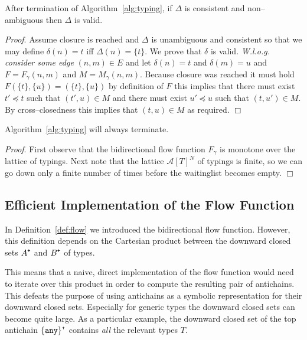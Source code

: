 \documentclass{sigplanconf}
\newcommand{\mc}[1]{\mathcal{#1}}
\newcommand{\mt}[1]{\text{\tt #1}}
\begin{document}
\begin{samepage}
\begin{theorem}[Soundness]
After termination of Algorithm~\ref{alg:typing}, if $\Delta$ is
consistent and non--ambiguous then $\Delta$ is valid.
\end{theorem}
\emph{Proof}.
Assume closure is reached and $\Delta$ is unambiguous and consistent
so that we may define $\delta(n) = t$ iff $\Delta(n) = \{t\}$. We
prove that $\delta$ is valid. \emph{W.l.o.g. consider some edge} $(n,
m) \in E$ and let $\delta(n) = t$ and $\delta(m) = u$ and $F =
F_\gamma(n, m)$ and $M = M_\gamma(n, m)$. Because closure was reached
it must hold $F(\{t\}, \{u\}) = (\{t\}, \{u\})$ by definition of $F$
this implies that there must exist $t' \preceq t$ such that $(t', u)
\in M$ and there must exist $u' \preceq u$ such that $(t, u') \in
M$. By cross--closedness this implies that $(t, u) \in M$ as
required. $\Box$
\end{samepage}

\begin{samepage}
\begin{theorem}[Termination]
Algorithm~\ref{alg:typing} will always terminate.
\end{theorem}
\emph{Proof}. First observe that the bidirectional flow function
$F_\gamma$ is monotone over the lattice of typings. Next note that the
lattice $\mc{A}[T]^N$ of typings is finite, so we can go down only a
finite number of times before the waitinglist becomes empty. $\Box$
\end{samepage}

\subsection{Efficient Implementation of the Flow Function}\label{sec:efficient}

In Definition~\ref{def:flow} we introduced the bidirectional flow
function. However, this definition depends on the Cartesian product
between the downward closed sets $A^\mt{+}$ and $B^\mt{+}$ of types.

This means that a naive, direct implementation of the flow function
would need to iterate over this product in order to compute the
resulting pair of antichains. This defeats the purpose of using
antichains as a symbolic representation for their downward closed
sets. Especially for generic types the downward closed sets can become
quite large. As a particular example, the downward closed set of the
top antichain $\{ \verb+any+ \}^\mt{+}$ contains \emph{all} the
relevant types $T$.
\end{document}
